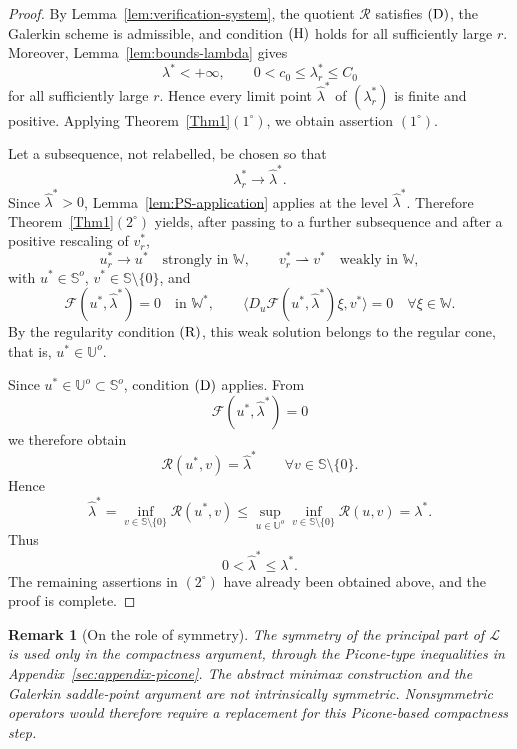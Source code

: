 \documentclass[preprint,10pt]{elsarticle}
\numberwithin{equation}{section}
\newtheorem{rem}[thm]{Remark}
\begin{document}
\begin{proof}
	By Lemma~\ref{lem:verification-system}, the quotient \(\mathcal R\)
	satisfies \({\rm (D)}\), the Galerkin scheme is admissible, and condition
	\({\rm (H)}\) holds for all sufficiently large \(r\). Moreover,
	Lemma~\ref{lem:bounds-lambda} gives
	\[
	\lambda^*<+\infty,
	\qquad
	0<c_0\le\lambda_r^*\le C_0
	\]
	for all sufficiently large \(r\). Hence every limit point
	\(\hat\lambda^*\) of \((\lambda_r^*)\) is finite and positive. Applying
	Theorem~\ref{Thm1}\((1^\circ)\), we obtain assertion \((1^\circ)\).
	
	Let a subsequence, not relabelled, be chosen so that
	\[
	\lambda_r^*\to\hat\lambda^* .
	\]
	Since \(\hat\lambda^*>0\), Lemma~\ref{lem:PS-application} applies at the
	level \(\hat\lambda^*\). Therefore Theorem~\ref{Thm1}\((2^\circ)\) yields,
	after passing to a further subsequence and after a positive rescaling of
	\(v_r^*\),
	\[
	u_r^*\to u^* \quad\text{strongly in }\mathbb W,
	\qquad
	v_r^*\rightharpoonup v^* \quad\text{weakly in }\mathbb W,
	\]
	with \(u^*\in\mathbb S^o\), \(v^*\in\mathbb S\setminus\{0\}\), and
	\[
	\mathcal F(u^*,\hat\lambda^*)=0
	\quad\text{in }\mathbb W^*,
	\qquad
	\bigl\langle
	D_u\mathcal F(u^*,\hat\lambda^*)\xi,v^*
	\bigr\rangle=0
	\quad \forall \xi\in\mathbb W .
	\]
	By the regularity condition \({\rm (R)}\), this weak solution belongs to
	the regular cone, that is, \(u^*\in\mathbb U^o\).
	
	Since \(u^*\in\mathbb U^o\subset\mathbb S^o\), condition \({\rm (D)}\)
	applies. From
	\[
	\mathcal F(u^*,\hat\lambda^*)=0
	\]
	we therefore obtain
	\[
	\mathcal R(u^*,v)=\hat\lambda^*
	\qquad
	\forall v\in\mathbb S\setminus\{0\}.
	\]
	Hence
	\[
	\hat\lambda^*
	=
	\inf_{v\in\mathbb S\setminus\{0\}}\mathcal R(u^*,v)
	\le
	\sup_{u\in\mathbb U^o}
	\inf_{v\in\mathbb S\setminus\{0\}}\mathcal R(u,v)
	=
	\lambda^* .
	\]
	Thus
	\[
	0<\hat\lambda^*\le\lambda^* .
	\]
	The remaining assertions in \((2^\circ)\) have already been obtained above,
	and the proof is complete.
\end{proof}

\begin{rem}[On the role of symmetry]
	The symmetry of the principal part of \(\mathcal L\) is used only in the
	compactness argument, through the Picone-type inequalities in
	Appendix~\ref{sec:appendix-picone}. The abstract minimax construction and
	the Galerkin saddle-point argument are not intrinsically symmetric.
	Nonsymmetric operators would therefore require a replacement for this
	Picone-based compactness step.
\end{rem}
\end{document}
